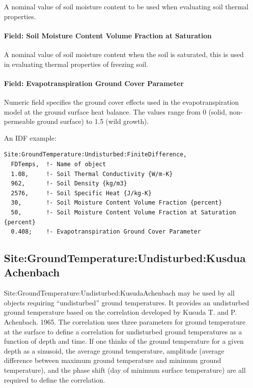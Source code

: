A nominal value of soil moisture content to be used when evaluating soil thermal properties.

\paragraph{Field: Soil Moisture Content Volume Fraction at Saturation}\label{field-soil-moisture-content-volume-fraction-at-saturation}

A nominal value of soil moisture content when the soil is saturated, this is used in evaluating thermal properties of freezing soil.

\paragraph{Field: Evapotranspiration Ground Cover Parameter}\label{field-evapotranspiration-ground-cover-parameter}

Numeric field specifies the ground cover effects used in the evapotranspiration model at the ground surface heat balance. The values range from 0 (solid, non-permeable ground surface) to 1.5 (wild growth).

An IDF example:

\begin{lstlisting}
Site:GroundTemperature:Undisturbed:FiniteDifference,
  FDTemps,  !- Name of object
  1.08,     !- Soil Thermal Conductivity {W/m-K}
  962,      !- Soil Density {kg/m3}
  2576,     !- Soil Specific Heat {J/kg-K}
  30,       !- Soil Moisture Content Volume Fraction {percent}
  50,       !- Soil Moisture Content Volume Fraction at Saturation {percent} 
  0.408;    !- Evapotranspiration Ground Cover Parameter
\end{lstlisting}

\subsection{Site:GroundTemperature:Undisturbed:KusduaAchenbach}\label{sitegroundtemperatureundisturbedkusduaachenbach}

Site:GroundTemperature:Undisturbed:KusudaAchenbach may be used by all objects requiring ``undisturbed'' ground temperatures. It provides an undisturbed ground temperature based on the correlation developed by Kusuda T. and P. Achenbach. 1965. The correlation uses three parameters for ground temperature at the surface to define a correlation for undisturbed ground temperatures as a function of depth and time. If one thinks of the ground temperature for a given depth as a sinusoid, the average ground temperature, amplitude (average difference between maximum ground temperature and minimum ground temperature), and the phase shift (day of minimum surface temperature) are all required to define the correlation.

